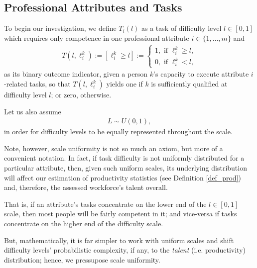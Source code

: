\documentclass[hidelinks, nonatbib]{elsarticle}
\begin{document}
\subsection{Professional Attributes and Tasks}
\begin{definition}
    \label{def_task}
    To begin our investigation, we define $T_i(l)$ as a task of difficulty level $l \in [0,1]$ which requires only competence in one professional attribute $i \in \{1, \dots, m\}$ and
    \begin{gather}
        T(l,\ell_{i}^{k})
        :=
        [\ell_{i}^{k} \geq l]
        :=
        \begin{cases}
            1, \text{ if } \ell_{i}^{k} \geq l,
            \\
            0, \text{ if } \ell_{i}^{k} < l,
        \end{cases}
    \end{gather}
    as its binary outcome indicator, given a person $k$'s capacity to execute attribute $i$-related tasks, so that $T(l,\ell_{i}^{k})$ yields one if $k$ is sufficiently qualified at difficulty level $l$; or zero, otherwise.
\end{definition}
\begin{axiom}
    \label{sua}
    Let us also assume
    \begin{gather}
        L \sim U(0,1)
        ,
    \end{gather}
    in order for difficulty levels to be equally represented throughout the scale.
    
    Note, however, scale uniformity is not so much an axiom, but more of a convenient notation. In fact, if task difficulty is not uniformly distributed for a particular attribute, then, given such uniform scales, its underlying distribution will affect our estimation of productivity statistics (see Definition \ref{def_prod}) and, therefore, the assessed workforce's talent overall.
    
    That is, if an attribute's tasks concentrate on the lower end of the $l \in [0,1]$ scale, then most people will be fairly competent in it; and vice-versa if tasks concentrate on the higher end of the difficulty scale.
    
    But, mathematically, it is far simpler to work with uniform scales and shift difficulty levels' probabilistic complexity, if any, to the \textit{talent} (i.e. productivity) distribution; hence, we pressupose scale uniformity.
\end{axiom}
\end{document}
